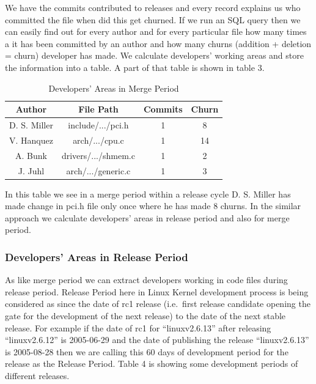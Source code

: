 \documentclass{acm_proc_article-sp}
\begin{document}
We have the commits contributed to releases and every record explains us who committed the file when did this get churned. If we run an SQL query then we can easily find out for every author and for every particular file how many times a it has been committed by an author and how many churns (addition + deletion = churn) developer has made. We calculate developers' working areas and store the information into a table. A part of that table is shown in table 3.

\begin{table}[ht]
\caption{Developers' Areas in Merge Period}  %
\centering 						%
\begin{tabular}{c c c c}				%
\hline\hline						%
Author		& File Path			& Commits		& Churn \\ [0.5ex]
\hline 							%
D. S. Miller	& include/.../pci.h		& 1				& 8 \\
V. Hanquez	& arch/.../cpu.c		& 1				& 14 \\
A. Bunk		& drivers/.../shmem.c	& 1				& 2 \\
J. Juhl		& arch/.../generic.c		& 1				& 3 \\
[1ex]							%
\hline 							%
\end{tabular}
\label{table:nonlin} 				%
\end{table}

In this table we see in a merge period within a release cycle D. S. Miller has made change in pci.h file only once where he has made 8 churns. In the similar approach we calculate developers' areas in release period and also for merge period.

\subsubsection{Developers' Areas in Release Period}
As like merge period we can extract developers working in code files during release period. Release Period here in Linux Kernel development process is being considered as since the date of rc1 release (i.e.\ first release candidate opening the gate for the development of the next release) to the date of the next stable release. For example if the date of rc1 for ``linuxv2.6.13'' after releasing ``linuxv2.6.12'' is 2005-06-29 and the date of publishing the release ``linuxv2.6.13'' is 2005-08-28 then we are calling this 60 days of development period for the release as the Release Period. Table 4 is showing some development periods of different releases.
\end{document}
